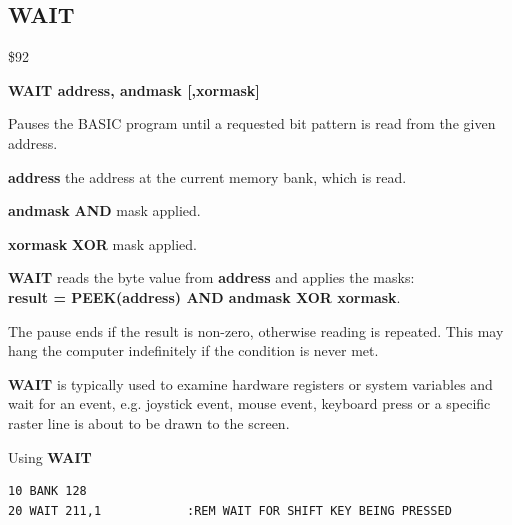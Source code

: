 \subsection{WAIT}
\begin{description}[leftmargin=2cm,style=nextline]
\item [Token:] \$92
\item [Format:] {\bf WAIT address, andmask [,xormask]}
\item [Usage:] Pauses the BASIC program until a requested
               bit pattern is read from the given address.

               {\bf address} the address at the current memory
               bank, which is read.

               {\bf andmask} {\bf AND} mask applied.

               {\bf xormask} {\bf XOR} mask applied.

               {\bf WAIT} reads the byte value from {\bf address}
               and applies the masks: \\
               {\bf result = PEEK(address) AND andmask XOR xormask}.

               The pause ends if the result is non-zero, otherwise
               reading is repeated. This may hang the computer
               indefinitely if the condition is never met.

\item [Remarks:] {\bf WAIT} is typically used to examine hardware
               registers or system variables
               and wait for an event, e.g. joystick event,
               mouse event, keyboard press or a specific raster line
               is about to be drawn to the screen.

\item [Example:] Using {\bf WAIT}
\begin{tcolorbox}[colback=black,coltext=white]
\verbatimfont{\codefont}
\begin{verbatim}
10 BANK 128
20 WAIT 211,1            :REM WAIT FOR SHIFT KEY BEING PRESSED
\end{verbatim}
\end{tcolorbox}
\end{description}


\newpage
